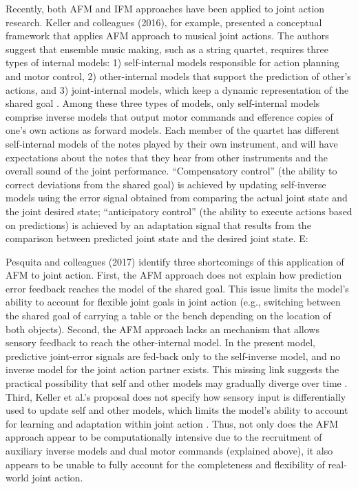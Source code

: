 \begin{CJK}{UTF8}{gbsn}
Recently, both AFM and IFM approaches have been applied to joint action research.  Keller and colleagues (2016), for example, presented a conceptual framework that applies AFM approach to musical joint actions.  The authors suggest that ensemble music making, such as a string quartet, requires three types of internal models:
1) self-internal models responsible for action planning and motor control, 2) other-internal models that support the prediction of other’s actions, and 3) joint-internal models, which keep a dynamic representation of the shared goal \citep{Keller2016}.  Among these three types of models, only self-internal models comprise inverse models that output motor commands and efference copies of one’s own actions as forward models.  Each member of the quartet has different self-internal models of the notes played by their own instrument, and will have expectations about the notes that they hear from other instruments and the overall sound of the joint performance.  ``Compensatory control'' (the ability to correct deviations from the shared goal) is achieved by updating self-inverse models using the error signal obtained from comparing the actual joint state and the joint desired state; ``anticipatory control'' (the ability to execute actions based on predictions) is achieved by an adaptation signal that results from the comparison between predicted joint state and the desired joint state.
E:

Pesquita and colleagues (2017) identify three shortcomings of this application of AFM to joint action.  First, the AFM approach does not explain how prediction error feedback reaches the model of the shared goal.  This issue limits the model’s ability to account for flexible joint goals in joint action (e.g., switching between the shared goal of carrying a table or the bench depending on the location of both objects).  Second, the AFM approach lacks an mechanism that allows sensory feedback to reach the other-internal model. In the present model, predictive joint-error signals are fed-back only to the self-inverse model, and no inverse model for the joint action partner exists. This missing link suggests the practical possibility that self and other models may gradually diverge over time \citep{Pickering2014}.  Third, Keller et al.’s proposal does not specify how sensory input is differentially used to update self and other models, which limits the model's ability to account for learning and adaptation within joint action \citep{Pesquita2017}.  Thus, not only does the AFM approach appear to be computationally intensive due to the recruitment of auxiliary inverse models and dual motor commands (explained above), it also appears to be unable to fully account for the completeness and flexibility of real-world joint action.


\end{CJK}
